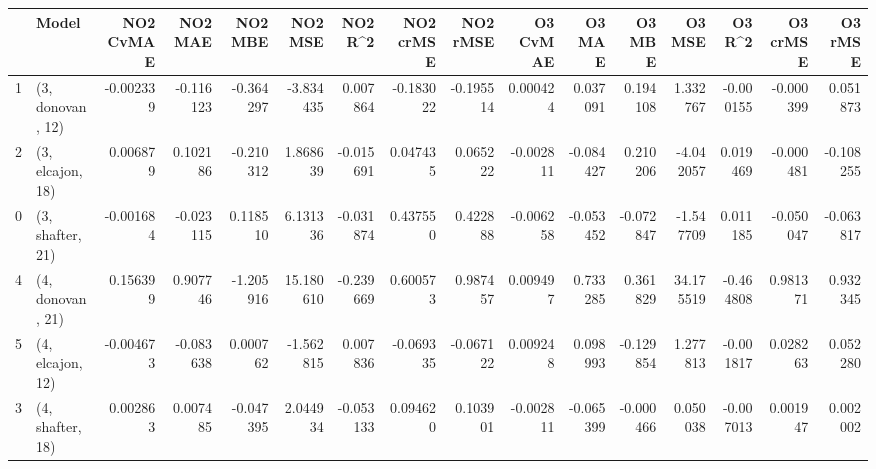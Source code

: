 \begin{tabular}{llrrrrrrrrrrrrrr}
\toprule
{} &             Model &  NO2 CvMAE &   NO2 MAE &   NO2 MBE &    NO2 MSE &   NO2 R\textasciicircum2 &  NO2 crMSE &  NO2 rMSE &  O3 CvMAE &    O3 MAE &    O3 MBE &     O3 MSE &    O3 R\textasciicircum2 &  O3 crMSE &   O3 rMSE \\
\midrule
1 &  (3, donovan, 12) &  -0.002339 & -0.116123 & -0.364297 &  -3.834435 &  0.007864 &  -0.183022 & -0.195514 &  0.000424 &  0.037091 &  0.194108 &   1.332767 & -0.000155 & -0.000399 &  0.051873 \\
2 &  (3, elcajon, 18) &   0.006879 &  0.102186 & -0.210312 &   1.868639 & -0.015691 &   0.047435 &  0.065222 & -0.002811 & -0.084427 &  0.210206 &  -4.042057 &  0.019469 & -0.000481 & -0.108255 \\
0 &  (3, shafter, 21) &  -0.001684 & -0.023115 &  0.118510 &   6.131336 & -0.031874 &   0.437550 &  0.422888 & -0.006258 & -0.053452 & -0.072847 &  -1.547709 &  0.011185 & -0.050047 & -0.063817 \\
4 &  (4, donovan, 21) &   0.156399 &  0.907746 & -1.205916 &  15.180610 & -0.239669 &   0.600573 &  0.987457 &  0.009497 &  0.733285 &  0.361829 &  34.175519 & -0.464808 &  0.981371 &  0.932345 \\
5 &  (4, elcajon, 12) &  -0.004673 & -0.083638 &  0.000762 &  -1.562815 &  0.007836 &  -0.069335 & -0.067122 &  0.009248 &  0.098993 & -0.129854 &   1.277813 & -0.001817 &  0.028263 &  0.052280 \\
3 &  (4, shafter, 18) &   0.002863 &  0.007485 & -0.047395 &   2.044934 & -0.053133 &   0.094620 &  0.103901 & -0.002811 & -0.065399 & -0.000466 &   0.050038 & -0.007013 &  0.001947 &  0.002002 \\
\bottomrule
\end{tabular}
